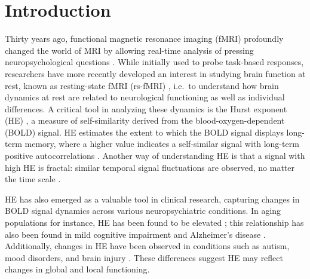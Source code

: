 \documentclass[
true
]{sn-jnl}
\begin{document}
\section{Introduction}\label{introduction}

Thirty years ago, functional magnetic resonance imaging (fMRI)
profoundly changed the world of MRI by allowing real-time analysis of
pressing neuropsychological questions
\citep{ogawaMagneticResonanceImaging1990, ogawaBrainMagneticResonance1990, stephanShortHistoryCausal2012}.
While initially used to probe task-based responses, researchers have
more recently developed an interest in studying brain function at rest,
known as resting-state fMRI (rs-fMRI)
\citep{decoRestingBrainsNever2013}, i.e.~to understand how brain
dynamics at rest are related to neurological functioning as well as
individual differences. A critical tool in analyzing these dynamics is
the Hurst exponent (HE)
\citep{campbellMonofractalAnalysisFunctional2022}, a measure of
self-similarity derived from the blood-oxygen-dependent (BOLD) signal.
HE estimates the extent to which the BOLD signal displays long-term
memory, where a higher value indicates a self-similar signal with
long-term positive autocorrelations
\citep{campbellMonofractalAnalysisFunctional2022, beggsBeingCriticalCriticality2012}.
Another way of understanding HE is that a signal with high HE is
fractal: similar temporal signal fluctuations are observed, no matter
the time scale \citep{campbellMonofractalAnalysisFunctional2022}.

HE has also emerged as a valuable tool in clinical research, capturing
changes in BOLD signal dynamics across various neuropsychiatric
conditions. In aging populations for instance, HE has been found to be
elevated
\citep{dongHurstExponentAnalysis2018, winkAgeCholinergicEffects2006};
this relationship has also been found in mild cognitive impairment and
Alzheimer's disease
\citep{maximFractionalGaussianNoise2005, longBrainnetomeAtlasBased2018}.
Additionally, changes in HE have been observed in conditions such as
autism, mood disorders, and brain injury
\citep{laiShiftRandomnessBrain2010, donaTemporalFractalAnalysis2017, weiIdentifyingMajorDepressive2013, jingIdentifyingCurrentRemitted2017, donaFractalAnalysisBrain2017}.
These differences suggest HE may reflect changes in global and local
functioning.
\end{document}
